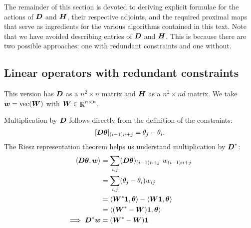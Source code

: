 \documentclass{article}
\begin{document}
The remainder of this section is devoted to deriving explicit formulae for the actions of \(\boldsymbol{D}\) and \(\boldsymbol{H}\), their respective adjoints, and the required proximal maps that serve as ingredients for the various algorithms contained in this text.
Note that we have avoided describing entries of \(\boldsymbol{D}\) and \(\boldsymbol{H}\).
This is because there are two possible approaches: one with redundant constraints and one without.

\subsection*{Linear operators with redundant constraints}

This version has \(\boldsymbol{D}\) as a \(n^{2} \times n\) matrix and \(\boldsymbol{H}\) as a \(n^{2} \times nd\) matrix.
We take \(\boldsymbol{w} = \mathop{\rm vec}\nolimits(\boldsymbol{W})\) with \(\boldsymbol{W} \in \mathop{\mathbb{R}}\nolimits^{n \times n}\).

Multiplication by \(\boldsymbol{D}\) follows directly from the definition of the constraints:
\begin{equation}
    \label{eq:operator_D_redundant}
    [\boldsymbol{D} \boldsymbol{\theta}]_{(i-1)n+j} = \theta_{j} - \theta_{i}.
\end{equation}
The Riesz representation theorem helps us understand multiplication by \(\boldsymbol{D}^{\ast}\):
\begin{equation}
    \label{eq:operator_Dt_redundant}
    \begin{split}
        \langle{\boldsymbol{D}\boldsymbol{\theta}, \boldsymbol{w}}\rangle
        &=
        \sum_{i,j} (\boldsymbol{D} \boldsymbol{\theta})_{(i-1)n+j}~w_{(i-1)n+j} \\
        &=
        \sum_{i,j} (\theta_{j} - \theta_{i}) w_{ij} \\
        &=
        \langle{\boldsymbol{W}^{\ast} \boldsymbol{1}, \boldsymbol{\theta}}\rangle
        -
        \langle{\boldsymbol{W}\boldsymbol{1}, \boldsymbol{\theta}}\rangle \\
        &=
        \langle{(\boldsymbol{W}^{\ast} - \boldsymbol{W}) \boldsymbol{1}, \boldsymbol{\theta}}\rangle \\
        \implies
        \boldsymbol{D}^{\ast} \boldsymbol{w}
        &=
        (\boldsymbol{W}^{\ast} - \boldsymbol{W}) \boldsymbol{1}
    \end{split}
\end{equation}
\end{document}
